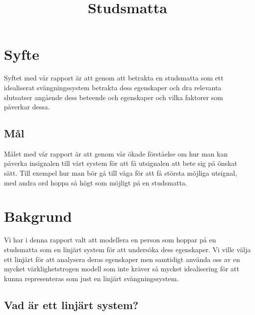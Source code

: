 \documentclass[10pt,a4paper]{article}
\begin{document}
\title{Studsmatta}
\maketitle

\tableofcontents

\section{Syfte}

Syftet med vår rapport är att genom att betrakta en studsmatta som ett idealiserat svängningssystem betrakta dess egenskaper och dra relevanta slutsatser angående dess beteende och egenskaper och vilka faktorer som påverkar dessa.

\subsection{Mål}

Målet med vår rapport är att genom vår ökade förståelse om hur man kan påverka insignalen till vårt system för att få utsignalen att bete sig på önskat sätt. Till exempel hur man bör gå till väga för att få största möjliga utsignal, med andra ord hoppa så högt som möjligt på en studsmatta.

\section{Bakgrund}

Vi har i denna rapport valt att modellera en person som hoppar på en studsmatta som en linjärt system för att undersöka dess egenskaper. Vi ville välja ett linjärt för att analysera deras egenskaper men samtidigt använda oss av en mycket värklighetstrogen modell som inte kräver så mycket idealisering för att kunna representeras som just en linjärt svängningssystem.

\subsection{Vad är ett linjärt system?}
\end{document}
